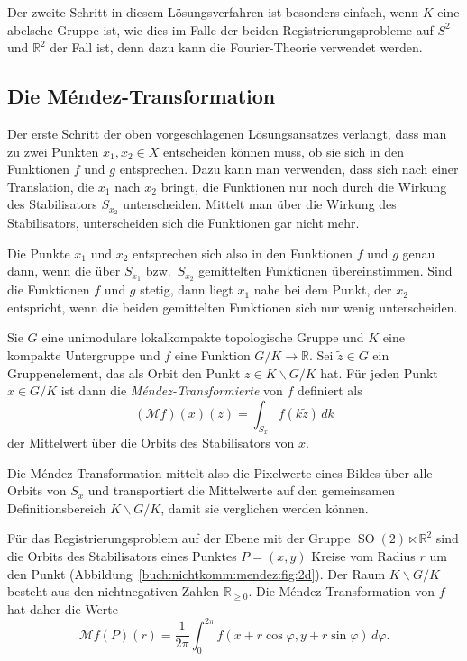Der zweite Schritt in diesem Lösungsverfahren ist besonders einfach,
wenn $K$ eine abelsche Gruppe ist, wie dies im Falle der beiden
Registrierungsprobleme auf $S^2$ und $\mathbb{R}^2$ der Fall ist,
denn dazu kann die Fourier-Theorie verwendet werden.

%
%
\subsection{Die Méndez-Transformation}
Der erste Schritt der oben vorgeschlagenen Lösungsansatzes verlangt,
dass man zu zwei Punkten $x_1,x_2\in X$ entscheiden können muss,
ob sie sich in den Funktionen $f$ und $g$ entsprechen.
Dazu kann man verwenden, dass sich nach einer Translation, die $x_1$ nach $x_2$
bringt, die Funktionen nur noch durch die Wirkung des Stabilisators
$S_{x_2}$ unterscheiden.
Mittelt man über die Wirkung des Stabilisators, unterscheiden
sich die Funktionen gar nicht mehr.

Die Punkte $x_1$ und $x_2$ entsprechen sich also in den Funktionen $f$
und $g$ genau dann, wenn die über $S_{x_1}$ bzw.~$S_{x_2}$
gemittelten Funktionen übereinstimmen.
Sind die Funktionen $f$ und $g$ stetig, dann liegt $x_1$ nahe bei
dem Punkt, der $x_2$ entspricht, wenn die beiden gemittelten Funktionen
sich nur wenig unterscheiden.

\begin{definition}
Sie $G$ eine unimodulare lokalkompakte topologische Gruppe und $K$
eine kompakte Untergruppe und $f$ eine Funktion $G/K\to \mathbb{R}$.
Sei $\tilde{z}\in G$ ein Gruppenelement, das als Orbit
den Punkt $z\in K\backslash G/K$ hat.
Für jeden Punkt $x\in G/K$ ist dann die {\em Méndez-Transformierte}
von $f$ definiert als
\[
(\mathcal{M}f)(x)(z)
=
\int_{S_x} f(k\tilde{z})\,dk
\]
der Mittelwert über die Orbits des Stabilisators von $x$.
\end{definition}

Die Méndez-Transformation mittelt also die Pixelwerte eines Bildes
über alle Orbits von $S_x$ und transportiert die Mittelwerte auf
den gemeinsamen Definitionsbereich $K\backslash G/K$, damit sie
verglichen werden können.

\begin{beispiel}

Für das Registrierungsproblem auf der Ebene mit der Gruppe
$\operatorname{SO}(2)\ltimes \mathbb{R}^2$ sind die Orbits des
Stabilisators eines Punktes $P=(x,y)$ Kreise vom Radius $r$ um
den Punkt (Abbildung~\ref{buch:nichtkomm:mendez:fig:2d}).
Der Raum $K\backslash G/K$ besteht aus den nichtnegativen
Zahlen $\mathbb{R}_{\ge 0}$.
Die Méndez-Transformation von $f$ hat daher die Werte
\[
\mathcal{M}f(P)(r)
=
\frac{1}{2\pi}
\int_0^{2\pi}
f(x+r\cos\varphi,y+r\sin\varphi)\,d\varphi.
\]
\end{beispiel}

